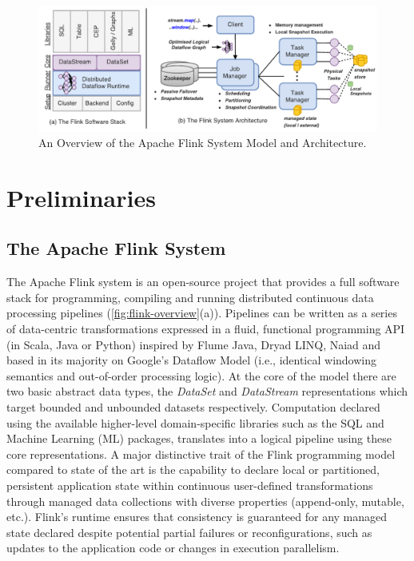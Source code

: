 \begin{figure}[t!]
\centering
\includegraphics[width=\textwidth]{figures/flinkoverview.pdf}
\caption{An Overview of the Apache Flink System Model and Architecture.} 
\label{fig:flink-overview}
\vspace{-4mm}
\end{figure}

\vspace{-2mm}
\section{Preliminaries}
\label{sec:preliminaries}
\vspace{-1mm}

\subsection{The Apache Flink System}
The Apache Flink system \cite{CUSTOM:web/Flink} is an open-source project that provides a full software stack for programming, compiling and running distributed continuous data processing pipelines (\autoref{fig:flink-overview}(a)). Pipelines can be written as a series of data-centric transformations expressed in a fluid, functional programming API (in Scala, Java or Python) inspired by Flume Java\cite{chambers2010flumejava}, Dryad LINQ\cite{yu2008dryadlinq}, Naiad\cite{murray2013naiad} and based in its majority on Google's Dataflow Model \cite{akidau2015dataflow} (i.e., identical windowing semantics and out-of-order processing logic). At the core of the model there are two basic abstract data types, the \emph{DataSet} and \emph{DataStream} representations which target bounded and unbounded datasets respectively. Computation declared using the available higher-level domain-specific libraries such as the SQL and Machine Learning (ML) packages, translates into a logical pipeline using these core representations. A major distinctive trait of the Flink programming model compared to state of the art is the capability to declare local or partitioned, persistent application state within continuous user-defined transformations through managed data collections with diverse properties (append-only, mutable, etc.). Flink's runtime ensures that consistency is guaranteed for any managed state declared despite potential partial failures or reconfigurations, such as updates to the application code or changes in execution parallelism.

